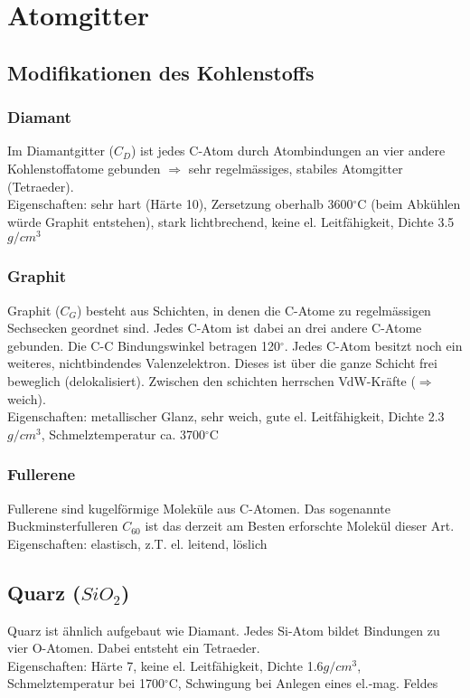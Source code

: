 \section{Atomgitter}

\subsection{Modifikationen des Kohlenstoffs}

\subsubsection{Diamant}
Im Diamantgitter ($C_D$) ist jedes C-Atom durch Atombindungen an vier andere Kohlenstoffatome gebunden $\Rightarrow$ sehr regelmässiges, stabiles Atomgitter (Tetraeder).\\
Eigenschaften: sehr hart (Härte 10), Zersetzung oberhalb 3600$^\circ$C (beim Abkühlen würde Graphit entstehen), stark lichtbrechend, keine el. Leitfähigkeit, Dichte 3.5 $g/cm^3$

\subsubsection{Graphit}
Graphit ($C_G$) besteht aus Schichten, in denen die C-Atome zu regelmässigen Sechsecken geordnet sind. Jedes C-Atom ist dabei an drei andere C-Atome gebunden. Die C-C Bindungswinkel betragen 120$^\circ$. Jedes C-Atom besitzt noch ein weiteres, nichtbindendes Valenzelektron. Dieses ist über die ganze Schicht frei beweglich (delokalisiert). Zwischen den schichten herrschen VdW-Kräfte ($\Rightarrow$ weich).\\ Eigenschaften:  metallischer Glanz, sehr weich, gute el. Leitfähigkeit, Dichte 2.3 $g/cm^3$, Schmelztemperatur ca. 3700$^\circ$C

\subsubsection{Fullerene}
Fullerene sind kugelförmige Moleküle aus C-Atomen. Das sogenannte Buckminsterfulleren $C_{60}$ ist das derzeit am Besten erforschte Molekül dieser Art.\\
Eigenschaften: elastisch, z.T. el. leitend, löslich

\subsection{Quarz ($SiO_2$)}
Quarz ist ähnlich aufgebaut wie Diamant. Jedes Si-Atom bildet Bindungen zu vier O-Atomen. Dabei entsteht ein Tetraeder.\\
Eigenschaften: Härte 7, keine el. Leitfähigkeit, Dichte 1.6$g/cm^3$, Schmelztemperatur bei 1700$^\circ$C, Schwingung bei Anlegen eines el.-mag. Feldes

